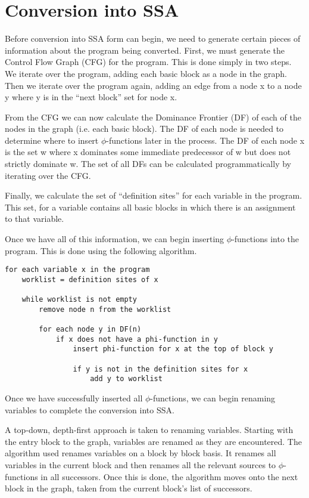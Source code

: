 \documentclass[a4paper,10pt]{report}
\begin{document}
\section{Conversion into SSA}
Before conversion into SSA form can begin, we need to generate certain pieces of information about the program being converted.
First, we must generate the Control Flow Graph (CFG) for the program. This is done simply in two steps. We iterate over
the program, adding each basic block as a node in the graph. Then we iterate over the program again, adding an edge from a node
x to a node y where y is in the ``next block'' set for node x.

From the CFG we can now calculate the Dominance Frontier (DF) of each of the nodes in the graph (i.e. each basic block).
The DF of each node is needed to determine where to insert \(\phi\)-functions later in the process. The DF of each node x is 
the set {w} where x dominates some immediate predecessor of w but does not strictly dominate w. The set of all DFs can be 
calculated programmatically by iterating over the CFG.

Finally, we calculate the set of ``definition sites'' for each variable in the program. This set, for a variable contains 
all basic blocks in which there is an assignment to that variable.

Once we have all of this information, we can begin inserting \(\phi\)-functions into the program. This is done using the
following algorithm.

\begin{verbatim}
for each variable x in the program
    worklist = definition sites of x

    while worklist is not empty
        remove node n from the worklist

        for each node y in DF(n)
            if x does not have a phi-function in y
                insert phi-function for x at the top of block y

                if y is not in the definition sites for x
                    add y to worklist
\end{verbatim}

Once we have successfully inserted all \(\phi\)-functions, we can begin renaming variables to complete the conversion into
SSA. 

A top-down, depth-first approach is taken to renaming variables. Starting with the entry block to the graph, variables are renamed as they
are encountered. The algorithm used renames variables on a block by block basis. It renames all variables in the current block
and then renames all the relevant sources to \(\phi\)-functions in all successors. Once this is done, the algorithm moves onto
the next block in the graph, taken from the current block's list of successors.
\end{document}
